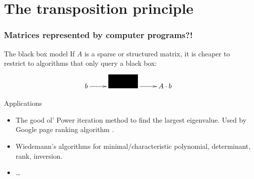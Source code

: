 \documentclass[10pt]{beamer}
\begin{document}

\section{The transposition principle}

\begin{frame}
  \frametitle{Matrices represented by computer programs?!}

  \begin{block}{The black box model}
    If $A$ is a sparse or structured matrix, it is cheaper to restrict
    to algorithms that only query a black box:
    \[\xymatrix{
      b\ar[r]  & \rule{10ex}{2em} \ar[r] & A\cdot b
    }\]
  \end{block}
  
  \begin{block}{Applications}
    \begin{itemize}
    \item The good ol' \alert{Power iteration method} to find the
      largest eigenvalue. Used by Google page ranking algorithm
      \cite{google}.
    \item Wiedemann's algorithms for minimal/characteristic
      polynomial, determinant, rank, inversion. \cite{Wie86}
    \item \dots
    \end{itemize}
  \end{block}
\end{frame}

\end{document}
